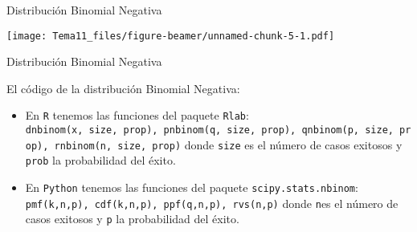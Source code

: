 \documentclass[
  ignorenonframetext,
]{beamer}
\providecommand{\tightlist}{%
  \setlength{\itemsep}{0pt}\setlength{\parskip}{0pt}}
\begin{document}
\begin{frame}{Distribución Binomial Negativa}
\protect\hypertarget{distribuciuxf3n-binomial-negativa-2}{}

\texttt{[image: Tema11\_files/figure-beamer/unnamed-chunk-5-1.pdf]}

\end{frame}

\begin{frame}[fragile]{Distribución Binomial Negativa}
\protect\hypertarget{distribuciuxf3n-binomial-negativa-3}{}

El código de la distribución Binomial Negativa:

\begin{itemize}
\tightlist
\item
  En \texttt{R} tenemos las funciones del paquete \texttt{Rlab}:
  \texttt{dnbinom(x,\ size,\ prop),\ pnbinom(q,\ size,\ prop),\ qnbinom(p,\ size,\ prop),\ rnbinom(n,\ size,\ prop)}
  donde \texttt{size} es el número de casos exitosos y \texttt{prob} la
  probabilidad del éxito.
\item
  En \texttt{Python} tenemos las funciones del paquete
  \texttt{scipy.stats.nbinom}:
  \texttt{pmf(k,n,p),\ cdf(k,n,p),\ ppf(q,n,p),\ rvs(n,p)} donde
  \texttt{n}es el número de casos exitosos y \texttt{p} la probabilidad
  del éxito.
\end{itemize}

\end{frame}
\end{document}
